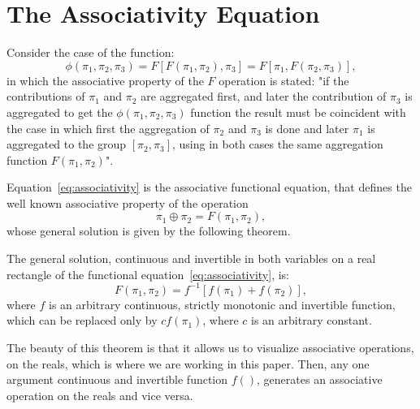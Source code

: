 \section{The Associativity Equation}

Consider the case of the function:
\begin{equation}
\phi(\pi_1,\pi_2,\pi_3) = F[F(\pi_1,\pi_2),\pi_3] = F[\pi_1,F(\pi_2,\pi_3)],
\label{eq:associativity}
\end{equation}
in which the associative property of the $F$ operation is stated: "if the contributions of $\pi_1$ and $\pi_2$ are aggregated first, and later the contribution of $\pi_3$ is aggregated to get the $\phi(\pi_1, \pi_2, \pi_3)$ function the result must be coincident with the case in which first the aggregation of $\pi_2$ and $\pi_3$ is done and later $\pi_1$ is aggregated to the group $[\pi_2, \pi_3]$, using in both cases the same aggregation function $F(\pi_1, \pi_2)$".

Equation~\eqref{eq:associativity} is the associative functional equation, that defines the well known associative property of the operation
\begin{equation}
\pi_1 \oplus \pi_2 = F(\pi_1,\pi_2),
\label{eq:operationdef}
\end{equation}
whose general solution is given by the following theorem.

\begin{theorem}
\label{thm:associativity}
The general solution, continuous and invertible in both variables on a real rectangle of the functional equation~\eqref{eq:associativity}, is:
\begin{equation}
F(\pi_1,\pi_2) = f^{-1}[f(\pi_1) + f(\pi_2)],
\label{eq:associativesolution}
\end{equation}
where $f$ is an arbitrary continuous, strictly monotonic and invertible function, which can be replaced only by $cf(\pi_1)$, where $c$ is an arbitrary constant.
\end{theorem}

The beauty of this theorem is that it allows us to visualize associative operations, on the reals, which is where we are working in this paper. Then, any one argument continuous and invertible function $f()$, generates an associative operation on the reals and vice versa.

